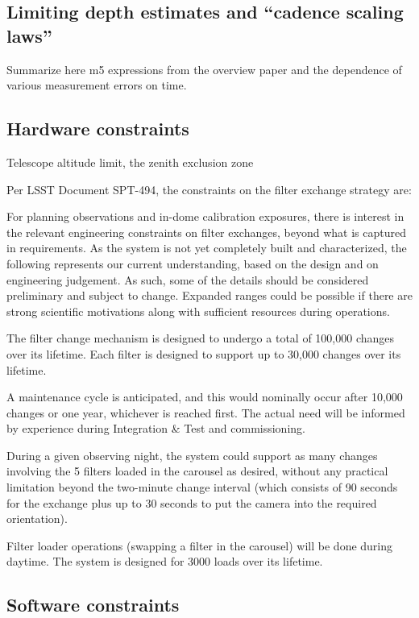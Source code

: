\documentclass[DM,lsstdraft,toc,usenatbib]{lsstdoc}
\begin{document}
\subsection{Limiting depth estimates and ``cadence scaling laws''} 

Summarize here m5 expressions from the overview paper and the dependence
of various measurement errors on time. 


\subsection{Hardware constraints}


Telescope altitude limit, the zenith exclusion zone 


Per LSST Document SPT-494, the constraints on the filter exchange strategy are: 

For planning observations and in-dome calibration exposures, there is interest in the relevant engineering constraints on filter exchanges, beyond what is captured in requirements. As the system is not yet completely built and characterized, the following represents our current understanding, based on the design and on engineering judgement. As such, some of the details should be considered preliminary and subject to change. Expanded ranges could be possible if there are strong scientific motivations along with sufficient resources during operations.

The filter change mechanism is designed to undergo a total of 100,000 changes over its lifetime. Each filter is designed to support up to 30,000 changes over its lifetime.

A maintenance cycle is anticipated, and this would nominally occur after 10,000 changes or one year, whichever is reached first. The actual need will be informed by experience during Integration \& Test and commissioning.

During a given observing night, the system could support as many changes involving the 5 filters loaded in the carousel as desired, without any practical limitation beyond the two-minute change interval (which consists of 90 seconds for the exchange plus up to 30 seconds to put the camera into the required orientation). 

Filter loader operations (swapping a filter in the carousel) will be done during daytime. The system is designed for 3000 loads over its lifetime. 




\subsection{Software constraints} 
\end{document}

